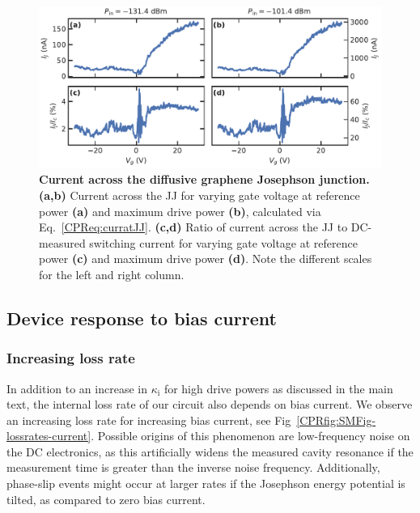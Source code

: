 \begin{figure}
	\centering
	\includegraphics[width=\linewidth]{chapter-gJJ-CPR/figs/SMFigure-curratJJ}
	\caption{
		\textbf{Current across the diffusive graphene Josephson junction.}
		\textbf{(a,b)} Current across the JJ for varying gate voltage at reference power \textbf{(a)} and maximum drive power \textbf{(b)}, calculated via Eq.~\ref{CPReq:curratJJ}.
		\textbf{(c,d)} Ratio of current across the JJ to DC-measured switching current for varying gate voltage at reference power \textbf{(c)} and maximum drive power \textbf{(d)}.
		Note the different scales for the left and right column.
	}
	\label{CPRfig:SMFigcurratJJ}
\end{figure}

\subsection{Device response to bias current}\label{sec:SMfitbiascurrent}
\subsubsection{Increasing loss rate}
In addition to an increase in $\kappa_\text{i}$ for high drive powers as discussed in the main text, the internal loss rate of our circuit also depends on bias current.
%
We observe an increasing loss rate for increasing bias current, see Fig~\ref{CPRfig:SMFig-lossrates-current}.
%
Possible origins of this phenomenon are low-frequency noise on the DC electronics, as this artificially widens the measured cavity resonance if the measurement time is greater than the inverse noise frequency.
%
Additionally, phase-slip events might occur at larger rates if the Josephson energy potential is tilted, as compared to zero bias current.

